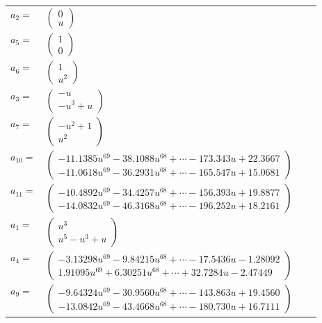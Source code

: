 \documentclass[1p]{elsarticle_modified}
\theoremstyle{definition}
\begin{document}
\begin{tabular}{m{7pt} m{180pt} m{7pt} m{180pt} }
\flushright $a_{2}=$&$\begin{pmatrix}0\\u\end{pmatrix}$ \\
\flushright $a_{5}=$&$\begin{pmatrix}1\\0\end{pmatrix}$ \\
\flushright $a_{6}=$&$\begin{pmatrix}1\\u^2\end{pmatrix}$ \\
\flushright $a_{3}=$&$\begin{pmatrix}- u\\- u^3+u\end{pmatrix}$ \\
\flushright $a_{7}=$&$\begin{pmatrix}- u^2+1\\u^2\end{pmatrix}$ \\
\flushright $a_{10}=$&$\begin{pmatrix}-11.1385 u^{69}-38.1088 u^{68}+\cdots-173.343 u+22.3667\\-11.0618 u^{69}-36.2931 u^{68}+\cdots-165.547 u+15.0681\end{pmatrix}$ \\
\flushright $a_{11}=$&$\begin{pmatrix}-10.4892 u^{69}-34.4257 u^{68}+\cdots-156.393 u+19.8877\\-14.0832 u^{69}-46.3168 u^{68}+\cdots-196.252 u+18.2161\end{pmatrix}$ \\
\flushright $a_{1}=$&$\begin{pmatrix}u^3\\u^5- u^3+u\end{pmatrix}$ \\
\flushright $a_{4}=$&$\begin{pmatrix}-3.13298 u^{69}-9.84215 u^{68}+\cdots-17.5436 u-1.28092\\1.91095 u^{69}+6.30251 u^{68}+\cdots+32.7284 u-2.47449\end{pmatrix}$ \\
\flushright $a_{9}=$&$\begin{pmatrix}-9.64324 u^{69}-30.9560 u^{68}+\cdots-143.863 u+19.4560\\-13.0842 u^{69}-43.4668 u^{68}+\cdots-180.730 u+16.7111\end{pmatrix}$ \\

\end{tabular}
\end{document}
